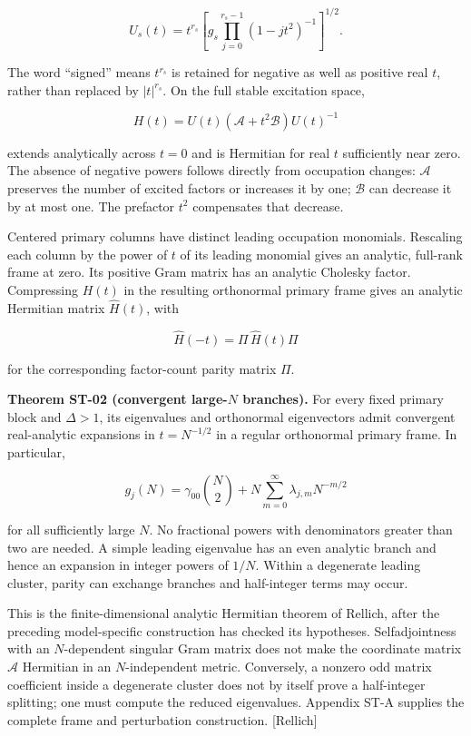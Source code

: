 \[
U_s(t)=t^{r_s}
\left[g_s\prod_{j=0}^{r_s-1}(1-jt^2)^{-1}\right]^{1/2}.
\]

The word ``signed'' means \(t^{r_s}\) is retained for negative as well as positive real \(t\), rather than replaced by \(|t|^{r_s}\). On the full stable excitation space,

\[
H(t)=U(t)(\mathscr A+t^2\mathscr B)U(t)^{-1}
\]

extends analytically across \(t=0\) and is Hermitian for real \(t\) sufficiently near zero. The absence of negative powers follows directly from occupation changes: \(\mathscr A\) preserves the number of excited factors or increases it by one; \(\mathscr B\) can decrease it by at most one. The prefactor \(t^2\) compensates that decrease.

Centered primary columns have distinct leading occupation monomials. Rescaling each column by the power of \(t\) of its leading monomial gives an analytic, full-rank frame at zero. Its positive Gram matrix has an analytic Cholesky factor. Compressing \(H(t)\) in the resulting orthonormal primary frame gives an analytic Hermitian matrix \(\widehat H(t)\), with

\[
\widehat H(-t)=\Pi\,\widehat H(t)\Pi
\]

for the corresponding factor-count parity matrix \(\Pi\).

\textbf{Theorem ST-02 (convergent large-\(N\) branches).} For every fixed primary block and \(\Delta>1\), its eigenvalues and orthonormal eigenvectors admit convergent real-analytic expansions in \(t=N^{-1/2}\) in a regular orthonormal primary frame. In particular,

\[
g_j(N)=\gamma_{00}\binom N2+
N\sum_{m=0}^{\infty}\lambda_{j,m}N^{-m/2}
\]

for all sufficiently large \(N\). No fractional powers with denominators greater than two are needed. A simple leading eigenvalue has an even analytic branch and hence an expansion in integer powers of \(1/N\). Within a degenerate leading cluster, parity can exchange branches and half-integer terms may occur.

This is the finite-dimensional analytic Hermitian theorem of Rellich, after the preceding model-specific construction has checked its hypotheses. Selfadjointness with an \(N\)-dependent singular Gram matrix does not make the coordinate matrix \(\mathscr A\) Hermitian in an \(N\)-independent metric. Conversely, a nonzero odd matrix coefficient inside a degenerate cluster does not by itself prove a half-integer splitting; one must compute the reduced eigenvalues. Appendix ST-A supplies the complete frame and perturbation construction. {[}Rellich{]}

